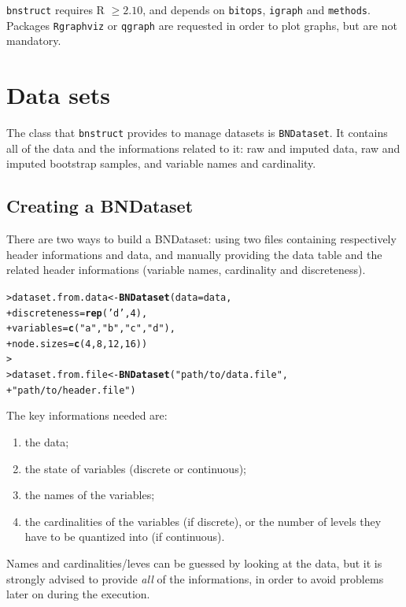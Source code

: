 \documentclass{article}\usepackage[]{graphicx}\usepackage[]{color}
\makeatletter
\newcommand{\hlnum}[1]{\textcolor[rgb]{0.686,0.059,0.569}{#1}}%
\newcommand{\hlstr}[1]{\textcolor[rgb]{0.192,0.494,0.8}{#1}}%
\newcommand{\hlstd}[1]{\textcolor[rgb]{0.345,0.345,0.345}{#1}}%
\newcommand{\hlkwb}[1]{\textcolor[rgb]{0.69,0.353,0.396}{#1}}%
\newcommand{\hlkwc}[1]{\textcolor[rgb]{0.333,0.667,0.333}{#1}}%
\newcommand{\hlkwd}[1]{\textcolor[rgb]{0.737,0.353,0.396}{\textbf{#1}}}%
\newenvironment{kframe}{%
 \def\at@end@of@kframe{}%
 \ifinner\ifhmode%
  \def\at@end@of@kframe{\end{minipage}}%
  \begin{minipage}{\columnwidth}%
 \fi\fi%
 \def\FrameCommand##1{\hskip\@totalleftmargin \hskip-\fboxsep
 \colorbox{shadecolor}{##1}\hskip-\fboxsep
     \hskip-\linewidth \hskip-\@totalleftmargin \hskip\columnwidth}%
 \MakeFramed {\advance\hsize-\width
   \@totalleftmargin\z@ \linewidth\hsize
   \@setminipage}}%
 {\par\unskip\endMakeFramed%
 \at@end@of@kframe}
\newenvironment{knitrout}{}{} %
\newcommand{\Robject}[1]{{\texttt{#1}}}
\newcommand{\Rpackage}[1]{{\texttt{#1}}}
\makeatother
\begin{document}
\Rpackage{bnstruct} requires R $\geq 2.10$,
and depends on \Rpackage{bitops}, \Rpackage{igraph} and \Rpackage{methods}.
Packages \Rpackage{Rgraphviz} or \Rpackage{qgraph} are requested in order to plot graphs,
but are not mandatory.


\section{Data sets}
The class that \Rpackage{bnstruct} provides to manage datasets is \Robject{BNDataset}.
It contains all of the data and the informations related to it: raw and imputed data, raw and imputed
bootstrap samples, and variable names and cardinality.

\subsection{Creating a BNDataset}
There are two ways to build a BNDataset: using two files containing respectively header informations
and data, and manually providing the data table and the related header informations
(variable names, cardinality and discreteness).

\begin{knitrout}
\color{fgcolor}\begin{kframe}
\begin{alltt}
\hlstd{> }\hlstd{dataset.from.data} \hlkwb{<-} \hlkwd{BNDataset}\hlstd{(}\hlkwc{data} \hlstd{= data,}
\hlstd{+ }                               \hlkwc{discreteness} \hlstd{=} \hlkwd{rep}\hlstd{(}\hlstr{'d'}\hlstd{,}\hlnum{4}\hlstd{),}
\hlstd{+ }                               \hlkwc{variables} \hlstd{=} \hlkwd{c}\hlstd{(}\hlstr{"a"}\hlstd{,} \hlstr{"b"}\hlstd{,} \hlstr{"c"}\hlstd{,} \hlstr{"d"}\hlstd{),}
\hlstd{+ }                               \hlkwc{node.sizes} \hlstd{=} \hlkwd{c}\hlstd{(}\hlnum{4}\hlstd{,}\hlnum{8}\hlstd{,}\hlnum{12}\hlstd{,}\hlnum{16}\hlstd{))}
\hlstd{> }
\hlstd{> }\hlstd{dataset.from.file} \hlkwb{<-} \hlkwd{BNDataset}\hlstd{(}\hlstr{"path/to/data.file"}\hlstd{,}
\hlstd{+ }                               \hlstr{"path/to/header.file"}\hlstd{)}
\end{alltt}
\end{kframe}
\end{knitrout}

The key informations needed are:
\begin{enumerate}
\item the data;
\item the state of variables (discrete or continuous);
\item the names of the variables;
\item the cardinalities of the variables (if discrete), or the number of levels they have to be quantized into
(if continuous). 
\end{enumerate}
Names and cardinalities/leves can be guessed by looking at the data, but it is strongly advised to provide
\textit{all} of the informations, in order to avoid problems later on during the execution.
\end{document}
